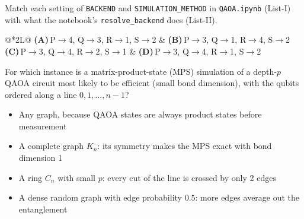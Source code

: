 \documentclass[11pt,a4paper]{article}
\newcommand{\optlabel}[1]{\textbf{(#1)}}
\newenvironment{qitem}[1]{\begin{list}{}{\setlength{\leftmargin}{3.3em}\setlength{\labelwidth}{3.1em}%
  \setlength{\labelsep}{0.2em}\setlength{\topsep}{3pt}\setlength{\parsep}{3pt}}\item[\textbf{Q.#1}\hfill]}{\end{list}}
\newcommand{\qsep}{\par\vspace{2pt}{\color{black!15}\hrule}\vspace{4pt}}
\begin{document}
\begin{qitem}{68}
Match each setting of \texttt{BACKEND} and \texttt{SIMULATION\_METHOD} in \texttt{QAOA.ipynb} (List-I) with what the notebook's
\texttt{resolve\_backend} does (List-II).
\par\smallskip{}
\par\smallskip\noindent\begin{tabularx}{\linewidth}{@{}*{2}{L}@{}}
\optlabel{A}\,P$\to$4, Q$\to$3, R$\to$1, S$\to$2 & \optlabel{B}\,P$\to$3, Q$\to$1, R$\to$4, S$\to$2 \\[3pt]
\optlabel{C}\,P$\to$3, Q$\to$4, R$\to$2, S$\to$1 & \optlabel{D}\,P$\to$3, Q$\to$4, R$\to$1, S$\to$2
\end{tabularx}
\end{qitem}
\qsep

\begin{qitem}{69}
For which instance is a matrix-product-state (MPS) simulation of a depth-$p$ QAOA circuit most likely to be efficient (small
bond dimension), with the qubits ordered along a line $0, 1, \dots, n-1$?
\begin{itemize}[leftmargin=2.6em, labelsep=0.4em, itemsep=2pt, topsep=3pt]
\item[\optlabel{A}] Any graph, because QAOA states are always product states before measurement
\item[\optlabel{B}] A complete graph $K_n$: its symmetry makes the MPS exact with bond dimension 1
\item[\optlabel{C}] A ring $C_n$ with small $p$: every cut of the line is crossed by only 2 edges
\item[\optlabel{D}] A dense random graph with edge probability $0.5$: more edges average out the entanglement
\end{itemize}
\end{qitem}
\qsep
\end{document}

